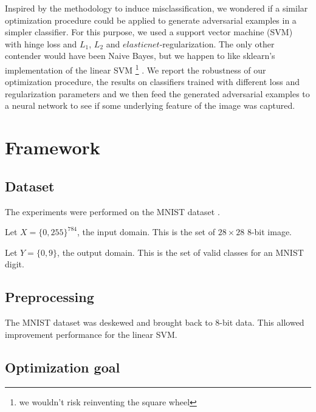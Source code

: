 \documentclass{article} %
\begin{document}
Inspired by the methodology to induce misclassification, we wondered
if a similar optimization procedure could be applied to generate adversarial
examples in a simpler classifier. For this purpose, we used a support vector machine (SVM) with hinge loss and $L_1$, $L_2$ and $elasticnet$-regularization. The only other contender would have been Naive Bayes,
but we happen to like sklearn's implementation of the linear SVM \footnote{we wouldn't
risk reinventing the square wheel} \citep{pedregosa_scikit-learn:_2011}.
We report the robustness of our optimization procedure, the results on classifiers
trained with different loss and regularization parameters and we then feed the 
generated adversarial examples to a neural network to see if some underlying
feature of the image was captured.



\section{Framework}


\subsection{Dataset}

The experiments were performed on the MNIST dataset \citep{lecun_mnist_1998}.

Let \begin{math} X=\{0, 255\}^{784} \end{math}, the input domain.
This is the set of $28\times28$ 8-bit image.

Let \begin{math} Y = \{0, 9\} \end{math}, the output domain.
This is the set of valid classes for an MNIST digit.


\subsection{Preprocessing}

The MNIST dataset was deskewed and brought back to 8-bit data. This allowed
improvement performance for the linear SVM.


\subsection{Optimization goal}
\end{document}
